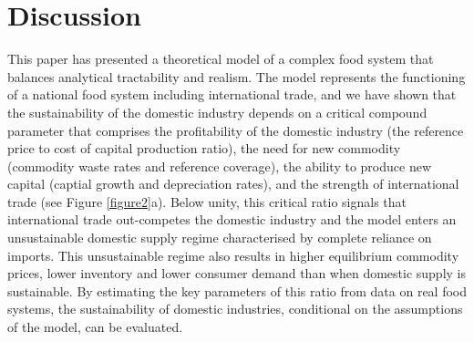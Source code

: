 \documentclass[9pt,twocolumn,twoside,lineno]{pnas-new}
\begin{document}
\section*{Discussion}
This paper has presented a theoretical model of a complex food system that balances analytical tractability and realism. The model represents the functioning of a national food system including international trade, and we have shown that the sustainability of the domestic industry depends on a critical compound parameter that comprises the profitability of the domestic industry (the reference price to cost of capital production ratio), the need for new commodity (commodity waste rates and reference coverage), the ability to produce new capital (captial growth and depreciation rates), and the strength of international trade (see Figure \ref{figure2}a). Below unity, this critical ratio signals that international trade out-competes the domestic industry and the model enters an unsustainable domestic supply regime characterised by complete reliance on imports. This unsustainable regime also results in higher equilibrium commodity prices, lower inventory and lower consumer demand than when domestic supply is sustainable. By estimating the key parameters of this ratio from data on real food systems, the sustainability of domestic industries, conditional on the assumptions of the model, can be evaluated.
\end{document}
